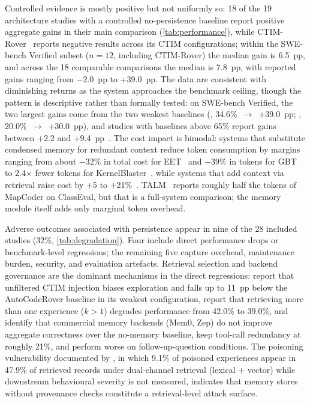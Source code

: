 Controlled evidence is mostly positive but not uniformly so:
18 of the 19 architecture studies with a controlled no-persistence
baseline report positive aggregate gains in their main comparison
(\autoref{tab:performance}), while
CTIM-Rover~\citep{lindenbauer2025ctimrover} reports negative results
across its CTIM configurations;
within the SWE-bench Verified subset ($n=12$, including CTIM-Rover)
the median gain is 6.5~pp, and across the 18 comparable comparisons
the median is 7.8~pp, with reported gains ranging from $-$2.0~pp
to +39.0~pp.
The data are consistent with diminishing returns as the system
approaches the benchmark ceiling, though the pattern is descriptive
rather than formally tested: on SWE-bench Verified, the two largest
gains come from the two weakest baselines
(\citet{li2026traversalaspolicy}, 34.6\%~$\to$~+39.0~pp;
\citet{zhang2025darwingodel}, 20.0\%~$\to$~+30.0~pp),
and studies with baselines above 65\% report gains between +2.2 and
+9.4~pp~\citep{chen2025sweexp,wu2025gcc,xia2025livesweagent,deng2026memcoder}.
The cost impact is bimodal: systems that substitute condensed memory
for redundant context reduce token consumption by margins ranging from
about $-32$\% in total cost for
EET~\citep{guo2026eet} and $-39$\% in tokens for
GBT~\citep{li2026traversalaspolicy} to 2.4$\times$ fewer tokens for
KernelBlaster~\citep{dong2026kernelblaster},
while systems that add context via retrieval raise cost by +5 to
+21\%~\citep{chen2025sweexp,wang2026memgovern,xia2025livesweagent}.
TALM~\citep{shen2025talm} reports roughly half the tokens of MapCoder
on ClassEval, but that is a full-system comparison;
the memory module itself adds only marginal token overhead.

Adverse outcomes associated with persistence appear in nine of the 28
included studies (32\%, \autoref{tab:degradation}).
Four include direct performance drops or benchmark-level regressions;
the remaining five capture overhead, maintenance burden, security, and
evaluation artefacts.
Retrieval selection and backend governance are the dominant mechanisms
in the direct regressions:
\citet{lindenbauer2025ctimrover} report that unfiltered CTIM injection
biases exploration and falls up to 11~pp below the AutoCodeRover
baseline in its weakest configuration,
\citet{chen2025sweexp} report that retrieving more than one experience
($k > 1$) degrades performance from 42.0\% to 39.0\%, and
\citet{deshpande2025memtrack} identify that commercial memory backends
(Mem0, Zep) do not improve aggregate correctness over the no-memory
baseline, keep tool-call redundancy at roughly 21\%, and perform worse
on follow-up-question conditions.
The poisoning vulnerability documented by
\citet{srivastava2025memorygraft}, in which 9.1\% of poisoned
experiences appear in 47.9\% of retrieved records under dual-channel
retrieval (lexical + vector) while downstream behavioural severity is
not measured, indicates that memory stores without provenance checks
constitute a retrieval-level attack surface.

